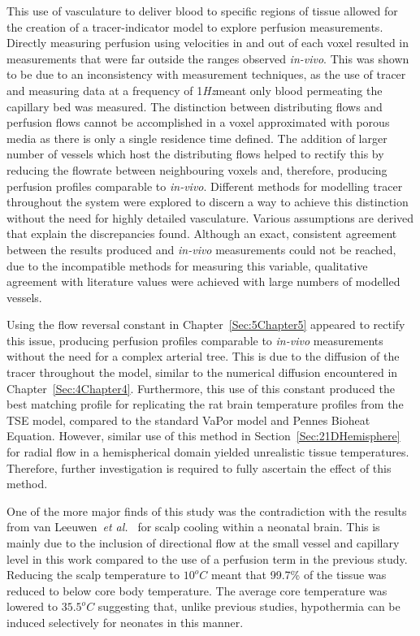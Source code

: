 \documentclass[11pt,english,a4paper,twoside,openright]{report}
\newcommand\Hertz{\mbox{\textit{Hz}}}
\begin{document}
{{{{{{{This use of vasculature to deliver blood to specific regions of tissue allowed for the creation of a tracer-indicator model to explore perfusion measurements. Directly measuring perfusion using velocities in and out of each voxel resulted in measurements that were far outside the ranges observed \textit{in-vivo}. This was shown to be due to an inconsistency with measurement techniques, as the use of tracer and measuring data at a frequency of 1\Hertz meant only blood permeating the capillary bed was measured. The distinction between distributing flows and perfusion flows cannot be accomplished in a voxel approximated with porous media as there is only a single residence time defined. The addition of larger number of vessels which host the distributing flows helped to rectify this by reducing the flowrate between neighbouring voxels and, therefore, producing perfusion profiles comparable to \textit{in-vivo}. Different methods for modelling tracer throughout the system were explored to discern a way to achieve this distinction without the need for highly detailed vasculature. Various assumptions are derived that explain the discrepancies found. Although an exact, consistent agreement between the results produced and \textit{in-vivo} measurements could not be reached, due to the incompatible methods for measuring this variable, qualitative agreement with literature values were achieved with large numbers of modelled vessels. 

Using the flow reversal constant in Chapter~\ref{Sec:5Chapter5} appeared to rectify this issue, producing perfusion profiles comparable to \textit{in-vivo} measurements without the need for a complex arterial tree. This is due to the diffusion of the tracer throughout the model, similar to the numerical diffusion encountered in Chapter~\ref{Sec:4Chapter4}. Furthermore, this use of this constant produced the best matching profile for replicating the rat brain temperature profiles from the TSE model, compared to the standard VaPor model and Pennes Bioheat Equation. However, similar use of this method in Section~\ref{Sec:21DHemisphere} for radial flow in a hemispherical domain yielded unrealistic tissue temperatures. Therefore, further investigation is required to fully ascertain the effect of this method.

One of the more major finds of this study was the contradiction with the results from van Leeuwen~\textit{et al.\ }\cite{van2000numerical} for scalp cooling within a neonatal brain. This is mainly due to the inclusion of directional flow at the small vessel and capillary level in this work compared to the use of a perfusion term in the previous study. Reducing the scalp temperature to $10^{o}C$ meant that 99.7\% of the tissue was reduced to below core body temperature. The average core temperature was lowered to $35.5^{o}C$ suggesting that, unlike previous studies, hypothermia can be induced selectively for neonates in this manner.  

}}}}}}}
\end{document}
